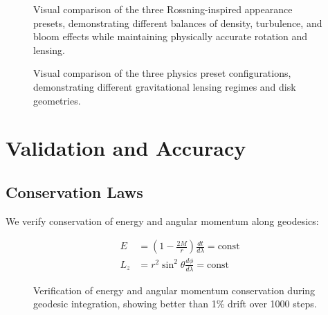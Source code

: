 \documentclass[12pt,a4paper]{article}
\theoremstyle{definition}
\theoremstyle{remark}
\begin{document}
\begin{figure}[H]
    \centering
    \caption{Visual comparison of the three Rossning-inspired appearance presets, demonstrating different balances of density, turbulence, and bloom effects while maintaining physically accurate rotation and lensing.}
    \label{fig:rossning_preset_comparison}
\end{figure}

\begin{figure}[H]
    \centering
    \caption{Visual comparison of the three physics preset configurations, demonstrating different gravitational lensing regimes and disk geometries.}
    \label{fig:preset_comparison}
\end{figure}

\section{Validation and Accuracy}

\subsection{Conservation Laws}

We verify conservation of energy and angular momentum along geodesics:

\begin{align}
    E &= \left(1 - \frac{2M}{r}\right)\frac{dt}{d\lambda} = \text{const} \\
    L_z &= r^2\sin^2\theta\frac{d\phi}{d\lambda} = \text{const}
\end{align}

\begin{figure}[H]
    \centering
    \caption{Verification of energy and angular momentum conservation during geodesic integration, showing better than 1\% drift over 1000 steps.}
    \label{fig:conservation_verification}
\end{figure}
\end{document}
